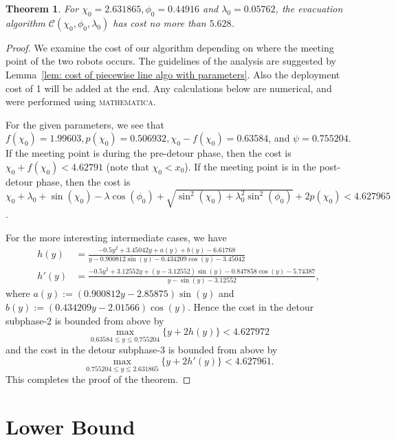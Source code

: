 \documentclass[
final
]{dmtcs-episciences}
\newcommand{\sinn}[1]{\sin \left({#1}\right)}
\newcommand{\coss}[1]{\cos \left({#1}\right)}
\newtheorem{theorem}{Theorem}[section]
\theoremstyle{definition}
\begin{document}
\begin{theorem}\label{thm: num performance piecewise line algo}
For $\chi_0=2.631865, \phi_0=0.44916$ and $\lambda_0=0.05762$, the evacuation algorithm $\mathcal C(\chi_0, \phi_0, \lambda_0)$ has cost no more than $5.628$. \end{theorem}

\begin{proof}
We examine the cost of our algorithm depending on where the meeting point of the two robots occurs. The guidelines of the analysis are suggested by Lemma~\ref{lem: cost of piecewise line algo with parameters}. Also the deployment cost of 1 will be added at the end. Any calculations below are numerical, and were performed using \textsc{mathematica}.

For the given parameters, we see that $f(\chi_0) = 1.99603, p(\chi_0)=0.506932, \chi_0-f(\chi_0)=0.63584$, and $\psi=0.755204$. If the meeting point is during the pre-detour phase, then the cost is $\chi_0 + f(\chi_0) <4.62791$ (note that $\chi_0<x_0$). If the meeting point is in the post-detour phase, then the cost is $\chi_0 + \lambda_0+\sinn{\chi_0}-\lambda\coss{\phi_0}+\sqrt{\sin^2(\chi_0)+\lambda_0^2\sin^2(\phi_0)} + 2p(\chi_0) < 4.627965$. 

For the more interesting intermediate cases, we have 
\begin{align*}
h(y) &= 
\frac{
-0.5 y^2
+3.45042 y
+ a(y) + b(y) -6.61768
}{
y-0.900812 \sin (y)-0.434209 \cos (y)-3.45042
}
\\
h'(y)&=
\frac{
-0.5 y^2+3.12552 y
+(y-3.12552) \sin (y)
- 0.847858 \cos(y)
-5.74387
}{
y
-\sin (y)
-3.12552},
\end{align*}
where $a(y) := (0.900812 y-2.85875) \sin (y)$
and $b(y) := (0.434209 y-2.01566) \cos (y)$.
Hence the cost in the detour subphase-2 is bounded from above by 
$$\max_{0.63584 \leq y \leq 0.755204} \{ y + 2h(y)\} < 4.627972$$ and the cost in the detour subphase-3 is bounded from above by 
$$\max_{0.755204 \leq y \leq 2.631865} \{ y + 2h'(y)\} < 4.627961.$$
This completes the proof of the theorem. 
\end{proof}


\section{Lower Bound}
\label{sec:Lower Bound}
\end{document}

